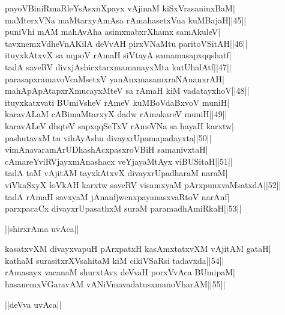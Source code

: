 \documentclass{article}
\begin{document}
payoVBiniRmaRleYsAsxnXpayx vAjinaM kiSxVrasaninxBaM|\\
maMterxVNa maMtarxyAmAsa rAmahasetxVna kuMBajaH||45||\\
puniVhi mAM mahAvAha asimxnabxrXhamx samAkuleV|\\
tavxnemxVdheVnAKilA deVvAH pirxVNaMtu paritoVSitAH||46||\\
ituyxkAtxvX sa nqpoV rAmaH siVtayA samamasapxqqshatf|\\
tadA saveRV divxjAshicxtarxmamanayxMta kutUhalAtf||47||\\
parasapxramavoVcaMsetxV yanAnxmasamxraNAnanxrAH|\\
mahApApAtapxrXmucayxMteV sa rAmaH kiM vadatayxhoV||48||\\
ituyxkatxvati BUmiVsheV rAmeV kuMBoVdaBxvoV muniH|\\
karavALaM cABimaMtarxyX dadw rAmakareV muniH||49||\\
karavALeV dhqteV sapxqqSeTxV rAmeVNa sa hayaH karxtw|\\
pashutavxM tu vihAyAshu divayxrUpamapadayxta||50||\\
vimAnavaramArUDhashAcxpasxroVBiH samanivxtaH|\\
cAmareYviRVjayxmAnashacx veYjayaMtAyx viBUSitaH||51||\\
tadA taM vAjitAM tayxkAtxvX divayxrUpadharaM naraM|\\
viVkaSxyX loVkAH karxtw saveRV visamxyaM pArxpunxvaMsatxdA||52||\\
tadA rAmaH savxyaM jAnanfjwcnxpayanasxvaRtoV narAnf|\\
parxpacaCx divayxrUpasathxM suraM paramadhAmiRkaH||53||\\

\begin{center}
||shirxrAma uvAca||
\end{center}

kasatxvXM divayxvapuH pArxpatxH kasAmxtatxvXM vAjitAM gataH|\\
kathaM surasitxrXVsahitaM kiM cikiVSaRsi tadavxda||54||\\
rAmasayx vacanaM shurxtAvx deVvaH porxVvAca BUmipaM|\\
hasanemxVGaravAM vANiVmavadatusxmanoVharAM||55||\\

\begin{center}
||deVva uvAca||
\end{center}
\end{document}
